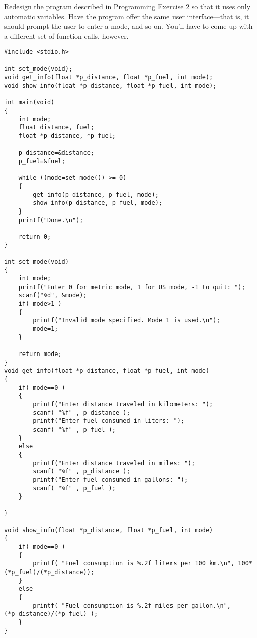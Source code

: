\begin{question}
Redesign the program described in Programming Exercise 2 so that it uses only automatic
variables. Have the program offer the same user interface—that is, it should prompt the
user to enter a mode, and so on. You’ll have to come up with a different set of function
calls, however.
\end{question}
\begin{solution}
  \begin{verbatim}
#include <stdio.h>

int set_mode(void);
void get_info(float *p_distance, float *p_fuel, int mode);
void show_info(float *p_distance, float *p_fuel, int mode);

int main(void)
{
	int mode;
	float distance, fuel;
	float *p_distance, *p_fuel;

	p_distance=&distance;
	p_fuel=&fuel;

	while ((mode=set_mode()) >= 0)
	{
		get_info(p_distance, p_fuel, mode);
		show_info(p_distance, p_fuel, mode);
	}
	printf("Done.\n");

	return 0;
}

int set_mode(void)
{
	int mode;
	printf("Enter 0 for metric mode, 1 for US mode, -1 to quit: ");
	scanf("%d", &mode);
	if( mode>1 )
	{
		printf("Invalid mode specified. Mode 1 is used.\n");
		mode=1;
	}

	return mode;
}
void get_info(float *p_distance, float *p_fuel, int mode)
{
	if( mode==0 )
	{
		printf("Enter distance traveled in kilometers: ");
		scanf( "%f" , p_distance );
		printf("Enter fuel consumed in liters: ");
		scanf( "%f" , p_fuel );
	}
	else
	{
		printf("Enter distance traveled in miles: ");
		scanf( "%f" , p_distance );
		printf("Enter fuel consumed in gallons: ");
		scanf( "%f" , p_fuel );
	}

}

void show_info(float *p_distance, float *p_fuel, int mode)
{
	if( mode==0 )
	{
		printf( "Fuel consumption is %.2f liters per 100 km.\n", 100*(*p_fuel)/(*p_distance));
	}
	else
	{
		printf( "Fuel consumption is %.2f miles per gallon.\n", (*p_distance)/(*p_fuel) );
	}
}
  \end{verbatim}
\end{solution}

